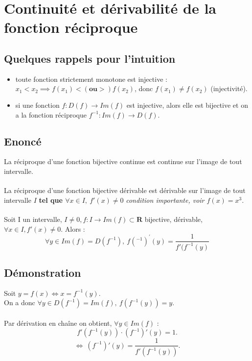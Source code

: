\documentclass{article}
\begin{document}
\newpage

\section{Continuité et dérivabilité de la fonction réciproque}

\subsection{Quelques rappels pour l'intuition}


\begin{itemize}
    \item toute fonction strictement monotone est injective :\\
$ x_1 < x_2 \implies f(x_1) < (\textbf{ou} >) f(x_2) $, donc $ f(x_1) \neq f(x_2) $ (injectivité).
    \item si une fonction $ f: D(f) \to Im(f) $ est injective, alors elle est bijective et on a la fonction réciproque $ f^{-1} : Im(f) \to D(f) $.
\end{itemize}

\subsection{Enoncé}

La réciproque d'une fonction bijective continue est continue sur l'image de tout intervalle.\\\\
La réciproque d'une fonction bijective dérivable est dérivable sur l'image de tout intervalle $ I $ \textbf{tel que $ \forall x \in I,\ f'(x) \neq 0 $} \textit{condition importante, voir $ f(x) = x^3 $}.\\\\
Soit I un intervalle, $ I \neq 0, f : I \to Im(f) \subset \mathbf{R} $ bijective, dérivable, $ \forall x \in I, f'(x) \neq 0 $. Alors :
\[ \forall y \in Im(f) = D(f^{-1}),\ f(^{-1})^{'}(y) = \frac{1}{f'(f^{-1}(y)} \]

\subsection{Démonstration}

Soit $ y = f(x) \Leftrightarrow x = f^{-1}(y) $.\\
On a donc $ \forall y \in D(f^{-1}) = Im(f),\ f(f^{-1}(y)) = y $.\\\\
Par dérivation en chaîne on obtient, $ \forall y \in Im(f) $ :
\[ f'(f^{-1}(y)) \cdot (f^{-1})'(y) = 1. \]
\[ \Leftrightarrow \ (f^{-1})'(y) = \frac{1}{f'(f^{-1}(y))}. \]
\end{document}
